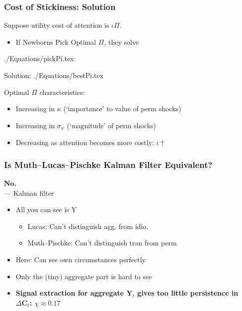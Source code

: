 \documentclass{beamer}\usepackage{dcolumn}
\newcommand{\jbemph}[1]{\textbf{\color{SlideNavy}#1}}
\providecommand{\econtexRoot}{.}
\providecommand{\eq}{\econtexRoot/Equations}
\begin{document}
\begin{frame}
\frametitle{Cost of Stickiness: Solution}
Suppose utility cost of attention is $\iota\Pi$.
\begin{itemize}
\item If Newborns Pick Optimal $\Pi$, they solve
\end{itemize}

 \eq/pickPi.tex

Solution:
 \eq/bestPi.tex

Optimal $\Pi$ characteristics:
\begin{itemize}
\item Increasing in $\kappa$ (`importance' to value of perm shocks)
\item Increasing in $\sigma_{\psi}$ (`magnitude' of perm shocks)
\item Decreasing as attention becomes more costly: $\iota \uparrow$
\end{itemize}


\end{frame}


\begin{frame}
\frametitle{Is Muth--Lucas--Pischke Kalman Filter Equivalent?}

\jbemph{No.}\\
\cite{muthOptimal}--\cite{lucas:imperfectInfo}--\cite{pischkeMicroMacro} Kalman filter
\begin{itemize}
\item  All you can see is Y
\begin{itemize}
\item Lucas: Can't distinguish agg. from idio.
\item Muth--Pischke: Can't distinguish tran from perm
\end{itemize}

\item Here: Can see own circumstances perfectly

\item Only the (tiny) aggregate part is hard to see

\item \jbemph{Signal extraction for aggregate $\mathbf{Y}_t$ gives too little persistence in $\Delta \mathbf{C}_t$: $\chi\approx 0.17$}


\end{itemize}

\end{frame}
\end{document}
